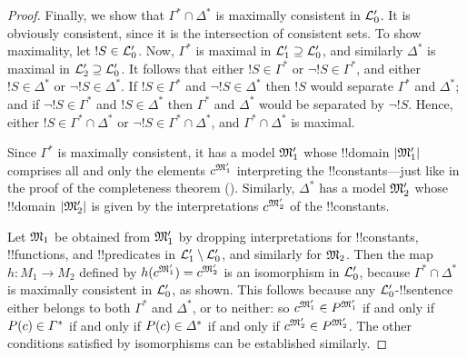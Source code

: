 \documentclass[../../../include/open-logic-section]{subfiles}
\begin{document}
\begin{proof}
Finally, we show that $\Gamma^* \cap \Delta^*$ is maximally consistent
in $\Lang{L}'_0$. It is obviously consistent, since it is the
intersection of consistent sets. To show maximality, let $!S \in
\Lang{L}'_0$. Now, $\Gamma^*$ is maximal in $\Lang{L'_1}
\supseteq \Lang{L'_0}$, and similarly $\Delta^*$ is maximal in
$\Lang{L'_2} \supseteq \Lang{L'_0}$. It follows that either
$!S \in \Gamma^*$ or $\lnot !S \in \Gamma^*$, and either
$!S \in \Delta^*$ or $\lnot !S \in \Delta^*$. If $!S \in
\Gamma^*$ and $\lnot !S \in \Delta^*$ then $!S$ would
separate $\Gamma^*$ and $\Delta^*$; and if $\lnot !S \in
\Gamma^*$ and $!S \in \Delta^*$ then $\Gamma^*$ and $\Delta^*$
would be separated by $\lnot !S$. Hence, either $!S \in
\Gamma^* \cap \Delta^*$ or $\lnot !S \in \Gamma^* \cap \Delta^*$,
and $\Gamma^* \cap \Delta^*$ is maximal. 

Since $\Gamma^*$ is maximally consistent, it has a model
$\Struct{M}'_1$ whose !!{domain} $\Domain{M'_1}$ comprises all and
only the elements $\Assign{c}{M'_1}$ interpreting the
!!{constant}s---just like in the proof of the completeness theorem
(). Similarly, $\Delta^*$ has a
model $\Struct{M}'_2$ whose !!{domain} $\Domain{M'_2}$ is given by the
interpretations $\Assign{c}{M'_2}$ of the !!{constant}s.

Let $\Struct{M_1}$ be obtained from $\Struct{M'_1}$ by dropping
interpretations for !!{constant}s, !!{function}s, and !!{predicate}s in
$\Lang{L'_1} \setminus \Lang{L'_0}$, and similarly for
$\Struct{M_2}$. Then the map $h \colon M_1 \to M_2$ defined by
$h(\Assign{c}{M'_1}) = \Assign{c}{M'_2}$ is an
isomorphism in $\Lang{L}'_0$, because $\Gamma^* \cap \Delta^*$ is
maximally consistent in $\Lang{L}'_0$, as shown. This follows
because any $\Lang{L}'_0$-!!{sentence} either belongs to both
$\Gamma^*$ and $\Delta^*$, or to neither: so $\Assign{c}{M'_1} \in
\Assign{P}{M'_1}$ if and only if $\mathord{P}(c) \in \Gamma^*$ if and only if
$\mathord{P}(c) \in \Delta^*$ if and only if $\Assign{c}{M'_2} \in
\Assign{P}{M'_2}$. The other conditions satisfied by isomorphisms
can be established similarly.


\end{proof}
\end{document}
